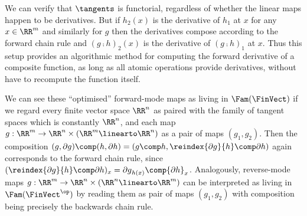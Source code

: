 We can verify that $\tangents$ is functorial, regardless of whether the linear maps happen to be derivatives.
But if $h_2(x)$ is the derivative of $h_1$ at $x$ for any $x \in \RR^m$ and similarly for $g$ then the
derivatives compose according to the forward chain rule and $(g \comp h)_2(x)$ is the derivative of $(g \comp
h)_1$ at $x$. Thus this setup provides an algorithmic method for computing the forward derivative of a
composite function, as long as all atomic operations provide derivatives, without have to recompute the
function itself.


We can see these ``optimised'' forward-mode maps as living in $\Fam(\FinVect)$ if we regard every finite
vector space $\RR^n$ as paired with the family of tangent spaces which is constantly $\RR^n$, and each map $g:
\RR^m \to \RR^n \times (\RR^m \linearto \RR^n)$ as a pair of maps $(g_1, g_2)$. Then the composition $(g,
\partial g) \comp (h, \partial h) = (g \comp h, \reindex{\partial g}{h} \comp \partial h)$ again corresponds
to the forward chain rule, since $(\reindex{\partial g}{h} \comp \partial h)_x = {\partial g}_{h(x)} \comp
{\partial h}_x$. Analogously, reverse-mode maps $g: \RR^m \to \RR^n \times (\RR^n \linearto \RR^m)$ can be
interpreted as living in $\Fam(\FinVect^\op)$ by reading them as pair of maps $(g_1, g_2)$ with composition
being precisely the backwards chain rule.
